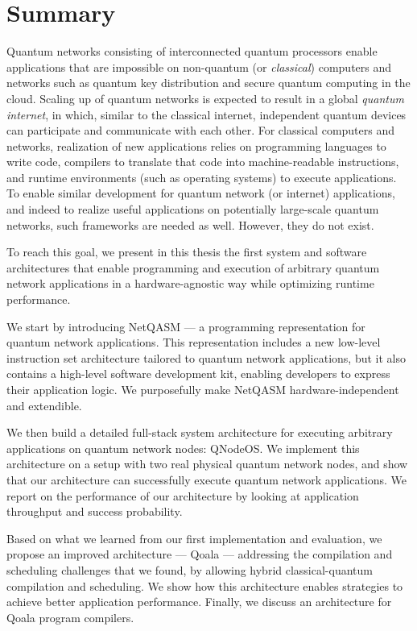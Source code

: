 \chapter*{Summary}


Quantum networks consisting of interconnected quantum processors enable applications that are impossible on non-quantum (or \emph{classical}) computers and networks such as quantum key distribution and secure quantum computing in the cloud.
Scaling up of quantum networks is expected to result in a global \textit{quantum internet}, in which, similar to the classical internet, independent quantum devices can participate and communicate with each other.
For classical computers and networks, realization of new applications relies on programming languages to write code, compilers to translate that code into machine-readable instructions, and runtime environments (such as operating systems) to execute applications.
To enable similar development for quantum network (or internet) applications, and indeed to realize useful applications on potentially large-scale quantum networks, such frameworks are needed as well.
However, they do not exist.

To reach this goal, we present in this thesis the first system and software architectures that enable programming and execution of arbitrary quantum network applications in a hardware-agnostic way while optimizing runtime performance.

We start by introducing NetQASM --- a programming representation for quantum network applications.
This representation includes a new low-level instruction set architecture tailored to quantum network applications, but it also contains a high-level software development kit, enabling developers to express their application logic.
We purposefully make NetQASM hardware-independent and extendible.

We then build a detailed full-stack system architecture for executing arbitrary applications on quantum network nodes: QNodeOS.
We implement this architecture on a setup with two real physical quantum network nodes, and show that our architecture can successfully execute quantum network applications.
We report on the performance of our architecture by looking at application throughput and success probability.

Based on what we learned from our first implementation and evaluation, we propose an improved architecture --- Qoala --- addressing the compilation and scheduling challenges that we found, by allowing hybrid classical-quantum compilation and scheduling.
We show how this architecture enables strategies to achieve better application performance.
Finally, we discuss an architecture for Qoala program compilers.


